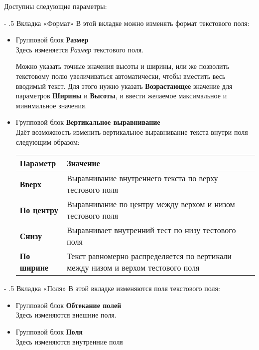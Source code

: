 ﻿\documentclass[a4paper,10pt]{article}
\makeatletter
\renewcommand\paragraph{%
   \@startsection{paragraph}{4}{0mm}%
      {-\baselineskip}%
      {.5\baselineskip}%
      {\normalfont\normalsize\bfseries}}
\makeatother
\begin{document}
Доступны следующие параметры:

\paragraph{Вкладка «Формат»}
В этой вкладке можно изменять формат текстового поля:
\begin{itemize}
 \item Групповой блок \textbf{Размер}\\
 Здесь изменяется \textit{Размер} текстового поля.
 
 Можно указать точные значения высоты и ширины, или же позволить текстовому полю увеличиваться автоматически, чтобы вместить весь вводимый текст. Для этого нужно указать \textbf{Возрастающее} значение для параметров \textbf{Ширины} и \textbf{Высоты}, и ввести желаемое максимальное и минимальное значения.
 \item Групповой блок \textbf{Вертикальное выравнивание}\\
 Даёт возможность изменить вертикальное выравнивание текста внутри поля следующим образом:
 
 \begin{center}
\begin{tabular}{  m{3cm}  m{14cm}  }
 \textbf{Параметр} & \textbf{Значение}\\ 
 \hline
  \textbf{Вверх} & Выравнивание внутреннего текста по верху тестового поля\\
  \textbf{По центру} & Выравнивание по центру между верхом и низом тестового поля\\ 
\textbf{Снизу} & Выравнивает внутренний тест по низу тестового поля\\
\textbf{По ширине} & Текст равномерно распределяется по вертикали между низом и верхом тестового поля\\
\end{tabular}
\end{center}
\end{itemize}

\paragraph{Вкладка «Поля»}
В этой вкладке изменяются поля текстового поля:
\begin{itemize}
 \item Групповой блок \textbf{Обтекание полей}\\
 Здесь изменяются внешние поля.
 \item Групповой блок \textbf{Поля}\\
 Здесь изменяются внутренние поля
\end{itemize}
\end{document}
